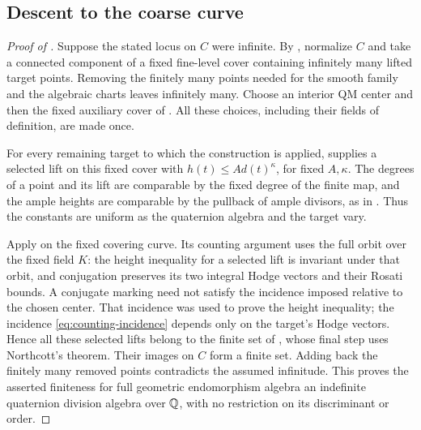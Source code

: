 \subsection{Descent to the coarse curve}

\begin{proof}[Proof of ]
Suppose the stated locus on $C$ were infinite.  By
, normalize $C$ and take a connected component
of a fixed fine-level cover containing infinitely many lifted target
points.  Removing the finitely many points needed for the smooth
family and the algebraic charts leaves infinitely many.  Choose an
interior QM center and then the fixed auxiliary cover of
.  All these choices, including their fields of
definition, are made once.

For every remaining target to which the construction is applied,
 supplies a selected lift on this fixed cover with
$h(t)\le A d(t)^\kappa$, for fixed $A,\kappa$.  The degrees of a point
and its lift are comparable by the fixed degree of the finite map, and
the ample heights are comparable by the pullback of ample divisors,
as in .  Thus the constants are uniform as the
quaternion algebra and the target vary.

Apply  on the fixed covering curve.
Its counting argument uses the full orbit over the fixed field $K$:
the height inequality for a selected lift is invariant under that
orbit, and conjugation preserves its two integral Hodge vectors and
their Rosati bounds.  A conjugate marking need not satisfy the
incidence imposed relative to the chosen center.  That incidence was
used to prove the height inequality; the incidence
\eqref{eq:counting-incidence} depends only on the target's Hodge
vectors.  Hence all these selected lifts belong to the finite set of
, whose final step uses Northcott's
theorem.  Their images on $C$ form a finite set.  Adding back the
finitely many removed points contradicts the assumed infinitude.
This proves the asserted finiteness for full geometric endomorphism
algebra an indefinite quaternion division algebra over $\mathbb Q$, with no
restriction on its discriminant or order.
\end{proof}
